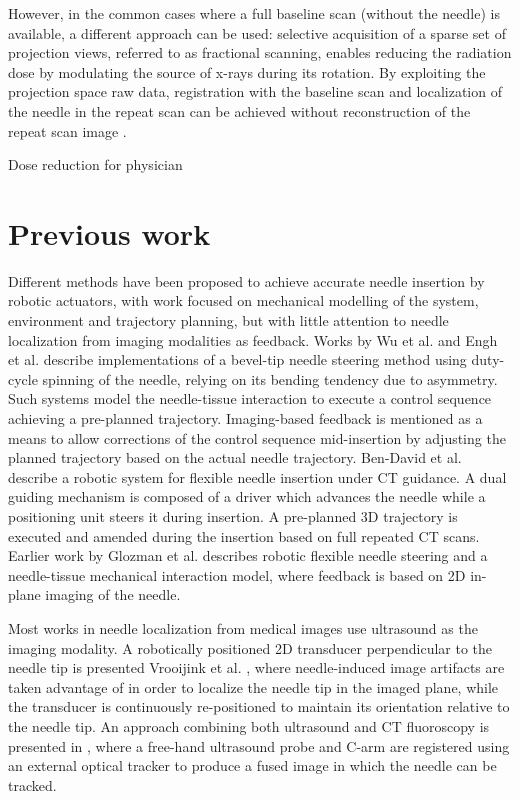 However, in the common cases where a full baseline scan (without the needle) is available, a different approach can be used:
selective acquisition of a sparse set of projection views, referred to as fractional scanning, enables reducing the radiation dose by modulating the source of x-rays during its rotation. By exploiting the projection space raw data, registration with the baseline scan and localization of the needle in the repeat scan can be achieved without reconstruction of the repeat scan image \cite{medan2017sparse, medan2017reduced}.

Dose reduction for physician \cite{miller2010occupational, sarti2012low}

\section{Previous work}
Different methods have been proposed to achieve accurate needle insertion by robotic actuators, with work focused on mechanical modelling of the system, environment and trajectory planning, but with little attention to needle localization from imaging modalities as feedback.
Works by Wu et al. \cite{wu2013automatic} and Engh et al. \cite{engh2010percutaneous} describe implementations of a bevel-tip needle steering method using duty-cycle spinning of the needle, relying on its bending tendency due to asymmetry. Such systems model the needle-tissue interaction to execute a control sequence achieving a pre-planned trajectory. Imaging-based feedback is mentioned as a means to allow corrections of the control sequence mid-insertion by adjusting the planned trajectory based on the actual needle trajectory.
Ben-David et al. \cite{ben2018robotic} describe a robotic system for flexible needle insertion under CT guidance. A dual guiding mechanism is composed of a driver which advances the needle while a positioning unit steers it during insertion. A pre-planned 3D trajectory is executed and amended during the insertion based on full repeated CT scans.
Earlier work by Glozman et al. \cite{glozman2007image} describes robotic flexible needle steering and a needle-tissue mechanical interaction model, where feedback is based on 2D in-plane imaging of the needle.

Most works in needle localization from medical images use ultrasound as the imaging modality. A robotically positioned 2D transducer perpendicular to the needle tip is presented Vrooijink et al. \cite{vrooijink2013real}, where needle-induced image artifacts are taken advantage of in order to localize the needle tip in the imaged plane, while the transducer is continuously re-positioned to maintain its orientation relative to the needle tip. An approach combining both ultrasound and CT fluoroscopy is presented in \cite{marinetto2017integration}, where a free-hand ultrasound probe and C-arm are registered using an external optical tracker to produce a fused image in which the needle can be tracked.

